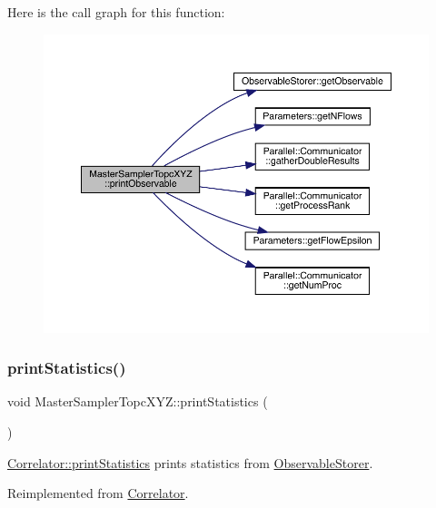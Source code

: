 Here is the call graph for this function\+:
\nopagebreak
\begin{figure}[H]
\begin{center}
\leavevmode
\includegraphics[width=350pt]{class_master_sampler_topc_x_y_z_ab2312c9e9dc1e9deeb5bce36784372ac_cgraph}
\end{center}
\end{figure}
\mbox{\label{class_master_sampler_topc_x_y_z_a5a34a7f90ce8eea6c0efa06cfdfeb5f1}} 
\subsubsection{\texorpdfstring{printStatistics()}{printStatistics()}}
{\footnotesize\ttfamily void Master\+Sampler\+Topc\+X\+Y\+Z\+::print\+Statistics (\begin{DoxyParamCaption}{ }\end{DoxyParamCaption})\hspace{0.3cm}{\ttfamily [virtual]}}



\mbox{\hyperlink{class_correlator_a2168d677f547769784781d2e2aaa53cf}{Correlator\+::print\+Statistics}} prints statistics from \mbox{\hyperlink{class_observable_storer}{Observable\+Storer}}. 



Reimplemented from \mbox{\hyperlink{class_correlator_a2168d677f547769784781d2e2aaa53cf}{Correlator}}.


